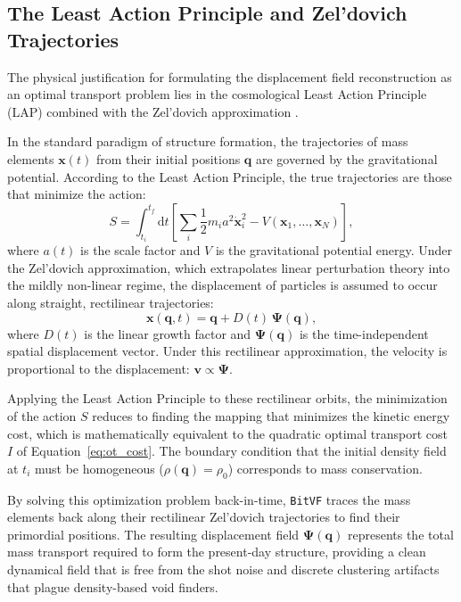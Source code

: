 \documentclass[12pt]{report}
\begin{document}
\subsection{The Least Action Principle and Zel'dovich Trajectories}
\label{sec:least_action}

The physical justification for formulating the displacement field reconstruction as an optimal transport problem lies in the cosmological Least Action Principle (LAP) combined with the Zel'dovich approximation \citep{Zeldovich1970,Peebles1989}.

In the standard paradigm of structure formation, the trajectories of mass elements $\mathbf{x}(t)$ from their initial positions $\mathbf{q}$ are governed by the gravitational potential. According to the Least Action Principle, the true trajectories are those that minimize the action:
\begin{equation}
    S = \int_{t_i}^{t_f} \mathrm{d}t \left[ \sum_i \frac{1}{2} m_i a^2 \dot{\mathbf{x}}_i^2 - V(\mathbf{x}_1, \dots, \mathbf{x}_N) \right]
    \label{eq:least_action},
\end{equation}
where $a(t)$ is the scale factor and $V$ is the gravitational potential energy. Under the Zel'dovich approximation, which extrapolates linear perturbation theory into the mildly non-linear regime, the displacement of particles is assumed to occur along straight, rectilinear trajectories:
\begin{equation}
    \mathbf{x}(\mathbf{q}, t) = \mathbf{q} + D(t)\,\boldsymbol{\Psi}(\mathbf{q})
    \label{eq:zeldovich_trajectory},
\end{equation}
where $D(t)$ is the linear growth factor and $\boldsymbol{\Psi}(\mathbf{q})$ is the time-independent spatial displacement vector. Under this rectilinear approximation, the velocity is proportional to the displacement: $\mathbf{v} \propto \boldsymbol{\Psi}$. 

Applying the Least Action Principle to these rectilinear orbits, the minimization of the action $S$ reduces to finding the mapping that minimizes the kinetic energy cost, which is mathematically equivalent to the quadratic optimal transport cost $I$ of Equation~\ref{eq:ot_cost}. The boundary condition that the initial density field at $t_i$ must be homogeneous ($\rho(\mathbf{q}) = \rho_0$) corresponds to mass conservation. 

By solving this optimization problem back-in-time, \texttt{BitVF} traces the mass elements back along their rectilinear Zel'dovich trajectories to find their primordial positions. The resulting displacement field $\boldsymbol{\Psi}(\mathbf{q})$ represents the total mass transport required to form the present-day structure, providing a clean dynamical field that is free from the shot noise and discrete clustering artifacts that plague density-based void finders.
\end{document}
